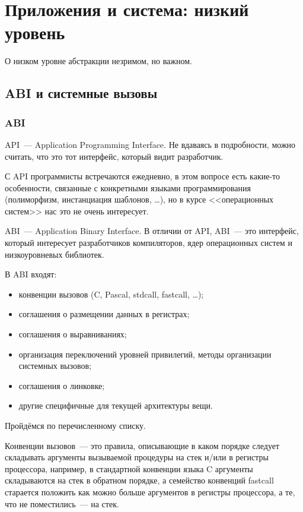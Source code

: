 \chapter{Приложения и система: низкий уровень}

О низком уровне абстракции незримом, но важном.

\section{ABI и системные вызовы}
\subsection{ABI}
\begin{definition}
API~--- Application Programming Interface.
Не вдаваясь в подробности, можно считать, что это тот интерфейс, который видит разработчик.
\end{definition}
С API программисты встречаются ежедневно, в этом вопросе есть какие-то особенности, связанные с конкретными языками программирования (полиморфизм, инстанциация шаблонов, \dots), но в курсе <<операционных систем>> нас это не очень интересует.

\begin{definition}
ABI~--- Application Binary Interface.
В отличии от API, ABI~--- это интерфейс, который интересует разработчиков компиляторов, ядер операционных систем и низкоуровневых библиотек.

В ABI входят:
\begin{itemize}
    \item конвенции вызовов (C, Pascal, stdcall, fastcall, \dots);
    \item соглашения о размещении данных в регистрах;
    \item соглашения о выравниваниях;
    \item организация переключений уровней привилегий, методы организации системных вызовов;
    \item соглашения о линковке;
    \item другие специфичные для текущей архитектуры вещи.
\end{itemize}
\end{definition}

Пройдёмся по перечисленному списку.

Конвенции вызовов~--- это правила, описывающие в каком порядке следует складывать аргументы вызываемой процедуры на стек и/или в регистры процессора, например, в стандартной конвенции языка C аргументы складываются на стек в обратном порядке, а семейство конвенций fastcall старается положить как можно больше аргументов в регистры процессора, а те, что не поместились~--- на стек.


